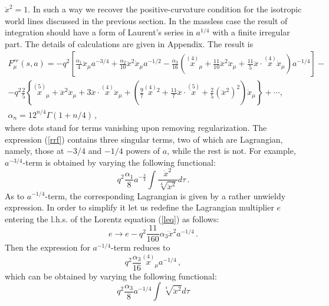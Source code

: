 \documentclass[a4paper,12pt]{article}
\begin{document}
$\ddot{x}^2=1$. In such a way we recover the positive-curvature
condition for the isotropic world lines discussed in the previous
section. In the massless case the result of integration should
have a form of Laurent's series in $a^{1/4}$ with a finite
irregular part. The details of calculations are given in
Appendix. The result is
\begin{equation}\label{rrf}
\begin{array}{c}
\displaystyle{    F^{rr}_\mu(s,a) =
-q^2\left[\frac{\alpha_1}{4}\ddot{x}_{\mu}a^{-3/4}+
    \frac{\alpha_2}{10}\dddot{x}^2\dot{x}_{\mu}a^{-1/2}-
    \frac{\alpha_3}{16}\left(\stackrel{(4)}{x}_\mu+\frac{11}{10}\dddot{x}^2\ddot{x}_\mu+
    \frac{11}{5}\dddot{x}\cdot\stackrel{(4)}{x}\dot{x}_\mu\right)a^{-1/4}\right]-}\\[8mm]
\displaystyle{
-{q^2}\frac25\left\{\stackrel{(5)}{x}_\mu+{\dddot{x}^2}\dddot{x}_\mu+
    3{\dddot{x}\cdot\stackrel{(4)}{x}}\ddot{x}_\mu+\left(\frac{9}{7}\stackrel{(4)}{x}{}^2+
    \frac{11}{7}\dddot{x}\cdot\stackrel{(5)}{x}+\frac{2}{5}(\dddot{x}^2)^2\right)\dot{x}_\mu\right\} }+\cdots
    ,\\[8mm]
    \alpha_n=12^{n/4}\Gamma\left(1+n/4\right)\,,
\end{array}
\end{equation}
where dots stand for terms vanishing upon removing regularization.
The expression (\ref{rrf}) contains three singular terms, two of
which are Lagrangian, namely, those at $-3/4$ and $-1/4$ powers
of $a$, while the rest is not. For example, $a^{-3/4}$-term is
obtained by varying the following functional:
\begin{equation}\label{}
q^2\frac{\alpha_1}{8}a^{-\frac34}\int{\frac{\dot{x}^2}{\sqrt[4]{\ddot{x}^2}}d\tau}
\,.
\end{equation}
As to $a^{-1/4}$-term, the corresponding Lagrangian is given by a
rather unwieldy expression. In order to simplify it let us
redefine the Lagrangian multiplier $e$ entering the l.h.s. of the
Lorentz equation (\ref{leq}) as follows:
\begin{equation}\label{ree}
    e\rightarrow e-q^2\frac{11}{160}\alpha_3\dddot{x}^2a^{-1/4}\,.
\end{equation}
Then the expression for $a^{-1/4}$-term reduces to
\begin{equation}\label{reterm}
   q^2 \frac{\alpha_3}{16}\stackrel{(4)}{x}_\mu a^{-1/4}\,,
\end{equation}
which can be obtained by varying the following functional:
\begin{equation}\label{}
    q^2\frac{\alpha_3}8a^{-1/4}\int{\sqrt[4]{\ddot{x}^2}}d\tau
\end{equation}
\end{document}
